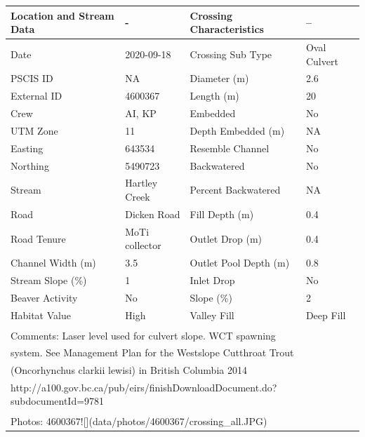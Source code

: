 \documentclass[
]{book}
\begin{document}
\begin{tabular}{l|l|l|l}
\hline
Location and Stream Data & - & Crossing Characteristics & --\\
\hline
Date & 2020-09-18 & Crossing Sub Type & Oval Culvert\\
\hline
PSCIS ID & NA & Diameter (m) & 2.6\\
\hline
External ID & 4600367 & Length (m) & 20\\
\hline
Crew & AI, KP & Embedded & No\\
\hline
UTM Zone & 11 & Depth Embedded (m) & NA\\
\hline
Easting & 643534 & Resemble Channel & No\\
\hline
Northing & 5490723 & Backwatered & No\\
\hline
Stream & Hartley Creek & Percent Backwatered & NA\\
\hline
Road & Dicken Road & Fill Depth (m) & 0.4\\
\hline
Road Tenure & MoTi collector & Outlet Drop (m) & 0.4\\
\hline
Channel Width (m) & 3.5 & Outlet Pool Depth (m) & 0.8\\
\hline
Stream Slope (\%) & 1 & Inlet Drop & No\\
\hline
Beaver Activity & No & Slope (\%) & 2\\
\hline
Habitat Value & High & Valley Fill & Deep Fill\\
\hline
\multicolumn{4}{l}{\textsuperscript{} Comments: Laser level used for culvert slope. WCT spawning}\\
\multicolumn{4}{l}{system. See Management Plan for the Westslope Cutthroat Trout}\\
\multicolumn{4}{l}{(Oncorhynchus clarkii lewisi) in British Columbia 2014}\\
\multicolumn{4}{l}{http://a100.gov.bc.ca/pub/eirs/finishDownloadDocument.do?subdocumentId=9781}\\
\multicolumn{4}{l}{\textsuperscript{} Photos: 4600367![](data/photos/4600367/crossing\_all.JPG)}\\
\end{tabular}
\end{document}
